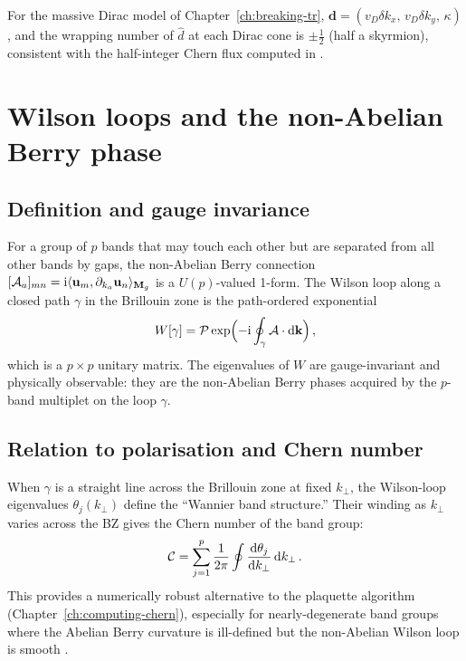 For the massive Dirac model of Chapter~\ref{ch:breaking-tr},
$\boldsymbol{d}=(v_D\delta k_x,\,v_D\delta k_y,\,\kappa)$, and
the wrapping number of $\hat{d}$ at each Dirac cone is $\pm\frac{1}{2}$
(half a skyrmion), consistent with the half-integer Chern flux computed
in .

\section{Wilson loops and the non-Abelian Berry phase}
\label{sec:ch5-wilson-detail}

\subsection{Definition and gauge invariance}
\label{sec:ch5-wilson-def}

For a group of $p$ bands that may touch each other but are separated
from all other bands by gaps, the non-Abelian Berry connection
$[\mathcal{A}_a]_{mn}=\mathrm{i}\langle \mathbf{u}_m , \partial_{k_a}\mathbf{u}_n \rangle_{\mathbf{M}_g}$
is a $U(p)$-valued 1-form.  The Wilson loop along a closed path
$\gamma$ in the Brillouin zone is the path-ordered exponential
\begin{equation}\label{eq:ch5-wilson-def}
  W[\gamma] = \mathcal{P}\exp\Bigl(
  -\mathrm{i}\oint_\gamma\mathcal{A}\cdot\mathrm{d}\mathbf{k}\Bigr)\,,
\end{equation}
which is a $p\times p$ unitary matrix.  The eigenvalues of $W$ are
gauge-invariant and physically observable: they are the non-Abelian
Berry phases acquired by the $p$-band multiplet on the loop $\gamma$.

\subsection{Relation to polarisation and Chern number}
\label{sec:ch5-wilson-polarisation}

When $\gamma$ is a straight line across the Brillouin zone at fixed
$k_\perp$, the Wilson-loop eigenvalues $\theta_j(k_\perp)$ define
the ``Wannier band structure.''  Their winding as $k_\perp$ varies
across the BZ gives the Chern number of the band group:
\begin{equation}\label{eq:ch5-wilson-chern-winding}
  \mathcal{C} = \sum_{j=1}^p\frac{1}{2\pi}
  \oint\frac{\mathrm{d}\theta_j}{\mathrm{d} k_\perp}\,\mathrm{d} k_\perp\,.
\end{equation}
This provides a numerically robust alternative to the plaquette
algorithm (Chapter~\ref{ch:computing-chern}), especially for
nearly-degenerate band groups where the Abelian Berry curvature is
ill-defined but the non-Abelian Wilson loop is smooth
\cite{gangaraj2016berry,price2022roadmap}.

